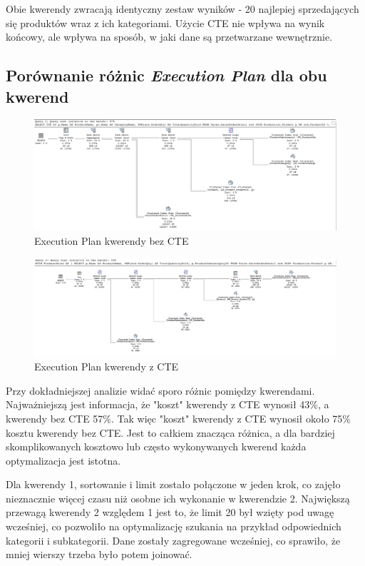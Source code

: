 \documentclass[a4paper,12pt]{article}
\begin{document}
Obie kwerendy zwracają identyczny zestaw wyników - 20 najlepiej sprzedających się produktów wraz z ich kategoriami. Użycie CTE nie wpływa na wynik końcowy, ale wpływa na sposób, w jaki dane są przetwarzane wewnętrznie.


\subsection{Porównanie różnic \textit{Execution Plan} dla obu kwerend}

\begin{figure}[H]
  \centering
  \includegraphics[width=1.0\textwidth]{images/query_1_plan.png}
  \caption{Execution Plan kwerendy bez CTE}
\end{figure}

\begin{figure}[H]
  \centering
  \includegraphics[width=1.0\textwidth]{images/query_2_plan.png}
  \caption{Execution Plan kwerendy z CTE}
\end{figure}

Przy dokładniejszej analizie widać sporo różnic pomiędzy kwerendami. Najważniejszą jest informacja, że "koszt" kwerendy z CTE wynosił 43\%, a kwerendy bez CTE 57\%. Tak więc "koszt" kwerendy z CTE wynosił około 75\% kosztu kwerendy bez CTE. Jest to całkiem znacząca różnica, a dla bardziej skomplikowanych kosztowo lub często wykonywanych kwerend każda optymalizacja jest istotna.

Dla kwerendy 1, sortowanie i limit zostało połączone w jeden krok, co zajęło nieznacznie więcej czasu niż osobne ich wykonanie w kwerendzie 2. Największą przewagą kwerendy 2 względem 1 jest to, że limit 20 był wzięty pod uwagę wcześniej, co pozwoliło na optymalizację szukania na przykład odpowiednich kategorii i subkategorii. Dane zostały zagregowane wcześniej, co sprawiło, że mniej wierszy trzeba było potem joinować.
\end{document}

